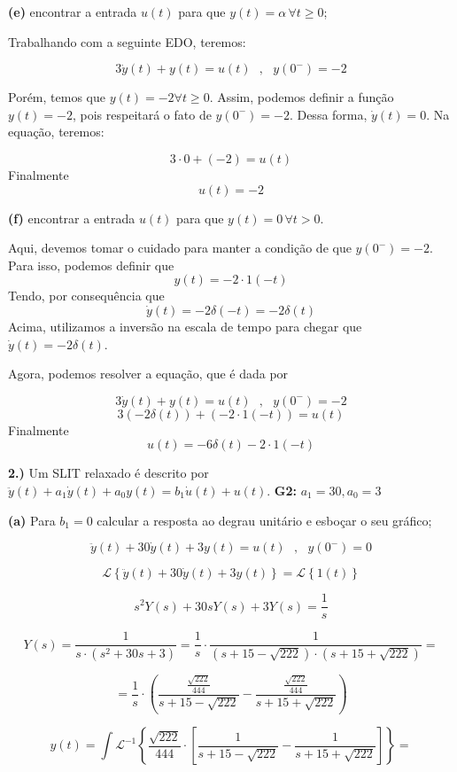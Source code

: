 \documentclass{article}
\begin{document}
\textbf{(e)} encontrar a entrada $u(t)$ para que $y(t) = \alpha\,\forall t \geq 0$;

Trabalhando com a seguinte EDO, teremos:

\[3\dot{y}(t) + y(t) = u(t)\,\,\,\,,\,\,\,\,y(0^-) = -2\]

Porém, temos que $y(t) = -2 \forall t \geq 0$. Assim, podemos definir a função $y(t) = -2$, pois respeitará o fato de $y(0^-) = -2$. Dessa forma, $\dot{y}(t) = 0$. Na equação, teremos:

\[3\cdot 0 + (-2) = u(t)\]
Finalmente
\[u(t) = -2\]

\textbf{(f)} encontrar a entrada $u(t)$ para que  $y(t) = 0\,\forall t > 0$.

Aqui, devemos tomar o cuidado para manter a condição de que $y(0^-) = -2$. Para isso, podemos definir que
\[y(t) = -2 \cdot 1(-t)\]
Tendo, por consequência que
\[\dot{y}(t) = -2\delta(-t) = -2\delta(t)\]
Acima, utilizamos a inversão na escala de tempo para chegar que $\dot{y}(t) = -2\delta(t)$.

Agora, podemos resolver a equação, que é dada por

\[3\dot{y}(t) + y(t) = u(t)\,\,\,\,,\,\,\,\,y(0^-) = -2\]
\[3(-2\delta(t)) + (-2\cdot 1(-t)) = u(t)\]
Finalmente
\[u(t) = -6\delta(t) - 2\cdot 1(-t)\]

\vspace{\baselineskip}

\textbf{2.)} Um SLIT relaxado é descrito por $\ddot{y}(t) + a_1\dot{y}(t) + a_0y(t) = b_1\dot{u}(t) + u(t)$.
\textbf{G2:} $a_1 = 30, a_0 = 3$

\textbf{(a)} Para $b_1 = 0$ calcular a resposta ao degrau unitário e esboçar o seu gráfico;

\[\ddot{y}(t) + 30\dot{y}(t) + 3y(t) = u(t)\,\,\,\,,\,\,\,\,y(0^{-}) = 0\]

\[\mathcal{L} \left\{\ddot{y}(t) + 30\dot{y}(t) + 3y(t)\right\} = \mathcal{L} \left\{1(t)\right\}\]

\[ s^{2}Y(s) + 30sY(s) + 3Y(s) = \frac{1}{s} \]

\[ Y(s) = \frac{1}{s \cdot (s^{2} + 30s + 3)} = \frac{1}{s} \cdot \frac{1}{(s + 15 - \sqrt{222}) \cdot (s + 15 + \sqrt{222})} =\]

\[ = \frac{1}{s} \cdot \left(\frac{ \frac{\sqrt{222}}{444}}{s + 15 - \sqrt{222}} - \frac{\frac{\sqrt{222}}{444}}{s + 15 + \sqrt{222}}\right) \]

\[ y(t) = \int \mathcal{L}^{-1} \left\{\frac{\sqrt{222}}{444} \cdot \left[ \frac{1}{s + 15 - \sqrt{222}} - \frac{1}{s + 15 + \sqrt{222}} \right] \right\} = \]
\end{document}

